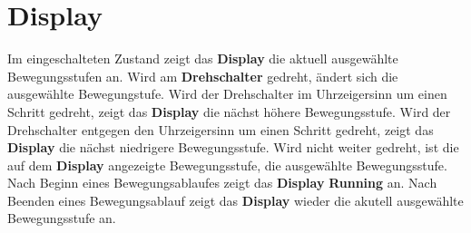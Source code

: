 %
%

\chapter{Display}



Im eingeschalteten Zustand zeigt das \textbf{Display} die aktuell ausgewählte Bewegungsstufen an. Wird am \textbf{Drehschalter} gedreht, ändert sich die ausgewählte Bewegungstufe. Wird der Drehschalter im Uhrzeigersinn um einen Schritt gedreht, zeigt das \textbf{Display} die nächst höhere Bewegungsstufe. Wird der Drehschalter entgegen den Uhrzeigersinn um einen Schritt gedreht, zeigt das \textbf{Display} die nächst niedrigere Bewegungsstufe. Wird nicht weiter gedreht, ist die auf dem \textbf{Display} angezeigte Bewegungsstufe, die ausgewählte Bewegungsstufe. Nach Beginn eines Bewegungsablaufes zeigt das \textbf{Display} \textbf{Running} an. Nach Beenden eines Bewegungsablauf zeigt das \textbf{Display} wieder die akutell ausgewählte Bewegungsstufe an. 

